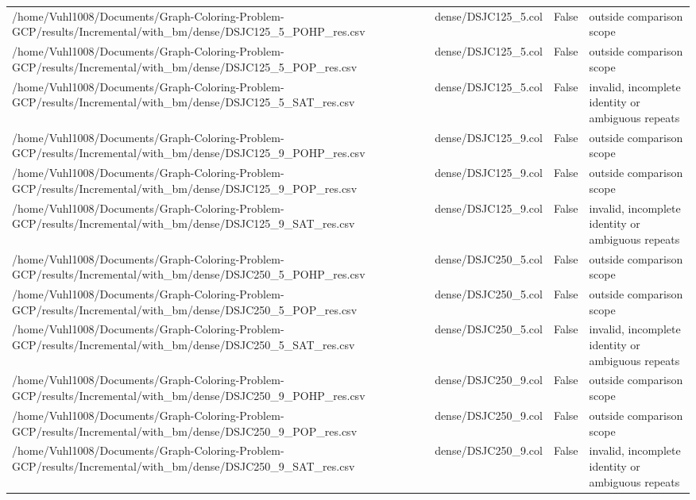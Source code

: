 \begin{table}[htbp]
\begin{tabular}{llll}
/home/Vuhl1008/Documents/Graph-Coloring-Problem-GCP/results/Incremental/with\_bm/dense/DSJC125\_5\_POHP\_res.csv & dense/DSJC125\_5.col & False & outside comparison scope \\
/home/Vuhl1008/Documents/Graph-Coloring-Problem-GCP/results/Incremental/with\_bm/dense/DSJC125\_5\_POP\_res.csv & dense/DSJC125\_5.col & False & outside comparison scope \\
/home/Vuhl1008/Documents/Graph-Coloring-Problem-GCP/results/Incremental/with\_bm/dense/DSJC125\_5\_SAT\_res.csv & dense/DSJC125\_5.col & False & invalid, incomplete identity or ambiguous repeats \\
/home/Vuhl1008/Documents/Graph-Coloring-Problem-GCP/results/Incremental/with\_bm/dense/DSJC125\_9\_POHP\_res.csv & dense/DSJC125\_9.col & False & outside comparison scope \\
/home/Vuhl1008/Documents/Graph-Coloring-Problem-GCP/results/Incremental/with\_bm/dense/DSJC125\_9\_POP\_res.csv & dense/DSJC125\_9.col & False & outside comparison scope \\
/home/Vuhl1008/Documents/Graph-Coloring-Problem-GCP/results/Incremental/with\_bm/dense/DSJC125\_9\_SAT\_res.csv & dense/DSJC125\_9.col & False & invalid, incomplete identity or ambiguous repeats \\
/home/Vuhl1008/Documents/Graph-Coloring-Problem-GCP/results/Incremental/with\_bm/dense/DSJC250\_5\_POHP\_res.csv & dense/DSJC250\_5.col & False & outside comparison scope \\
/home/Vuhl1008/Documents/Graph-Coloring-Problem-GCP/results/Incremental/with\_bm/dense/DSJC250\_5\_POP\_res.csv & dense/DSJC250\_5.col & False & outside comparison scope \\
/home/Vuhl1008/Documents/Graph-Coloring-Problem-GCP/results/Incremental/with\_bm/dense/DSJC250\_5\_SAT\_res.csv & dense/DSJC250\_5.col & False & invalid, incomplete identity or ambiguous repeats \\
/home/Vuhl1008/Documents/Graph-Coloring-Problem-GCP/results/Incremental/with\_bm/dense/DSJC250\_9\_POHP\_res.csv & dense/DSJC250\_9.col & False & outside comparison scope \\
/home/Vuhl1008/Documents/Graph-Coloring-Problem-GCP/results/Incremental/with\_bm/dense/DSJC250\_9\_POP\_res.csv & dense/DSJC250\_9.col & False & outside comparison scope \\
/home/Vuhl1008/Documents/Graph-Coloring-Problem-GCP/results/Incremental/with\_bm/dense/DSJC250\_9\_SAT\_res.csv & dense/DSJC250\_9.col & False & invalid, incomplete identity or ambiguous repeats \\

\end{tabular}
\end{table}
